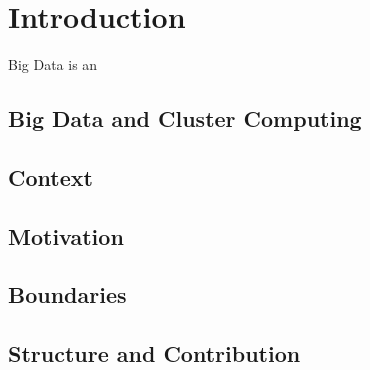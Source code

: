 \chapter{Introduction}

Big Data is an 

\section{Big Data and Cluster Computing}

\section{Context}

\section{Motivation}

\section{Boundaries}

\section{Structure and Contribution}